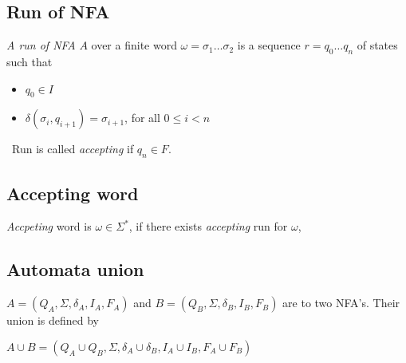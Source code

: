 \begin{comment}
	\subsection{Function $\hat{\delta}$}
	\label{defFunct}
		\begin{definition}
		A function $\hat{\delta}$ is define as
		\begin{description}
			$\hat{\delta}: Q\times\Sigma^{*}\rightarrow Q$
		\end{description}

		from $\delta$ by induction on the length of $x$:
			\begin{itemize}
				\item $\hat{\delta}(q,\epsilon)=q$, where $\epsilon$ is empty string
				\item $\hat{\delta}(q,xa)=\delta(\hat{\delta}(q,x),a)$
			\end{itemize}
		\end{definition}
\end{comment}


	\subsection{Run of NFA}
	\label{defRun}
	\begin{definition}
		\emph{A run of NFA }$A$ over a finite word $\omega=\sigma_1\dots\sigma_2$ is a sequence $r=q_0\dots q_n$ of states such that
		\begin{itemize}
			\item $q_0\in I$
			\item $\delta(\sigma_i,q_{i+1})=\sigma_{i+1}$, for all $0\leq i < n$
		\end{itemize}\
		Run is called \emph{accepting} if $q_n\in F$.
	\end{definition}

	\subsection{Accepting word}
	\label{defAWord}
	\begin{definition}
		\emph{Accpeting} word is $\omega \in \Sigma^{*}$, if there exists \emph{accepting} run for $\omega$,
	\end{definition}

	\subsection{Automata union}
	\label{defAUnion}
	\begin{definition}
		$A=(Q_A,\Sigma,\delta_A,I_A,F_A)$ and $B=(Q_B,\Sigma,\delta_B,I_B,F_B)$ are to two NFA's. Their union is defined by
		\begin{description}
			\item $A \cup B=(Q_A\cup Q_B,\Sigma,\delta_A\cup\delta_B,I_A\cup I_B,F_A\cup F_B)$
		\end{description}
	\end{definition}
	
